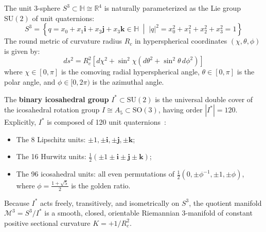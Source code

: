 \documentclass[11pt,a4paper]{article}
\theoremstyle{definition}
\newcommand{\SO}{\mathrm{SO}}
\newcommand{\SU}{\mathrm{SU}}
\begin{document}
The unit 3-sphere $S^3 \subset \mathbb{H} \cong \mathbb{R}^4$ is naturally parameterized as the Lie group $\SU(2)$ of unit quaternions:
\begin{equation}
S^3 = \left\{ q = x_0 + x_1 \mathbf{i} + x_2 \mathbf{j} + x_3 \mathbf{k} \in \mathbb{H} \;\middle|\; |q|^2 = x_0^2 + x_1^2 + x_2^2 + x_3^2 = 1 \right\}
\end{equation}
The round metric of curvature radius $R_c$ in hyperspherical coordinates $(\chi, \theta, \phi)$ is given by:
\begin{equation}
ds^2 = R_c^2 \left[ d\chi^2 + \sin^2\chi \left( d\theta^2 + \sin^2\theta\,d\phi^2 \right) \right]
\end{equation}
where $\chi \in [0, \pi]$ is the comoving radial hyperspherical angle, $\theta \in [0, \pi]$ is the polar angle, and $\phi \in [0, 2\pi)$ is the azimuthal angle.

The \textbf{binary icosahedral group} $I^* \subset \SU(2)$ is the universal double cover of the icosahedral rotation group $I \cong A_5 \subset \SO(3)$, having order $|I^*| = 120$. Explicitly, $I^*$ is composed of 120 unit quaternions~\cite{Klein1884}:
\begin{itemize}
    \item The 8 Lipschitz units: $\pm 1, \pm \mathbf{i}, \pm \mathbf{j}, \pm \mathbf{k}$;
    \item The 16 Hurwitz units: $\frac{1}{2} (\pm 1 \pm \mathbf{i} \pm \mathbf{j} \pm \mathbf{k})$;
    \item The 96 icosahedral units: all even permutations of $\frac{1}{2} \left(0, \pm \phi^{-1}, \pm 1, \pm \phi\right)$, where $\phi = \frac{1 + \sqrt{5}}{2}$ is the golden ratio.
\end{itemize}

Because $I^*$ acts freely, transitively, and isometrically on $S^3$, the quotient manifold $\mathcal{M}^3 = S^3 / I^*$ is a smooth, closed, orientable Riemannian 3-manifold of constant positive sectional curvature $K = +1/R_c^2$.
\end{document}
